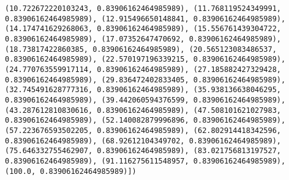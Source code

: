 \documentclass[11pt]{article}
\begin{document}
\begin{Verbatim}[commandchars=\\\{\}]
(10.722672220103243, 0.83906162464985989), (11.768119524349991, 0.83906162464985989), (12.915496650148841, 0.83906162464985989), (14.174741629268063, 0.83906162464985989), (15.556761439304722, 0.83906162464985989), (17.07352647470692, 0.83906162464985989), (18.73817422860385, 0.83906162464985989), (20.565123083486537, 0.83906162464985989), (22.570197196339215, 0.83906162464985989), (24.770763559917114, 0.83906162464985989), (27.185882427329428, 0.83906162464985989), (29.836472402833405, 0.83906162464985989), (32.745491628777316, 0.83906162464985989), (35.938136638046295, 0.83906162464985989), (39.442060594376599, 0.83906162464985989), (43.287612810830616, 0.83906162464985989), (47.508101621027983, 0.83906162464985989), (52.140082879996896, 0.83906162464985989), (57.223676593502205, 0.83906162464985989), (62.802914418342596, 0.83906162464985989), (68.92612104349702, 0.83906162464985989), (75.646332755462907, 0.83906162464985989), (83.021756813197527, 0.83906162464985989), (91.116275611548957, 0.83906162464985989), (100.0, 0.83906162464985989)])

    \end{Verbatim}
\end{document}
